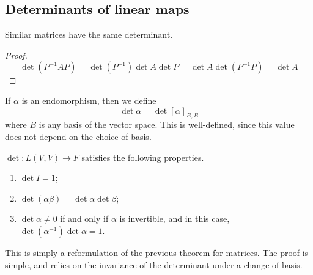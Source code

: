 \subsection{Determinants of linear maps}
\begin{lemma}
	Similar matrices have the same determinant.
\end{lemma}
\begin{proof}
	\[
		\det (P^{-1} A P) = \det(P^{-1}) \det A \det P = \det A \det (P^{-1} P) = \det A
	\]
\end{proof}
\begin{definition}
	If \( \alpha \) is an endomorphism, then we define
	\[
		\det \alpha = \det [\alpha]_{B, B}
	\]
	where \( B \) is any basis of the vector space.
	This is well-defined, since this value does not depend on the choice of basis.
\end{definition}
\begin{theorem}
	\( \det \colon L(V,V) \to F \) satisfies the following properties.
	\begin{enumerate}
		\item \( \det I = 1 \);
		\item \( \det (\alpha\beta) = \det\alpha \det\beta \);
		\item \( \det \alpha \neq 0 \) if and only if \( \alpha \) is invertible, and in this case, \( \det(\alpha^{-1}) \det \alpha = 1 \).
	\end{enumerate}
	This is simply a reformulation of the previous theorem for matrices.
	The proof is simple, and relies on the invariance of the determinant under a change of basis.
\end{theorem}


